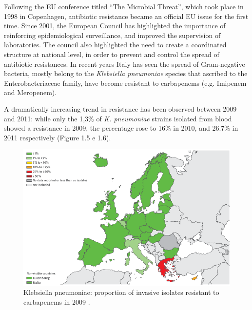 \documentclass[11pt]{report}
\begin{document}
\clearpage
Following the EU conference titled “The Microbial Threat”, which took place in 1998 in Copenhagen, antibiotic resistance became an official EU issue for the first time.
Since 2001, the European Council has highlighted the importance of reinforcing epidemiological surveillance, and improved the supervision of laboratories. The council also highlighted the need to create a coordinated structure at national level, in order to prevent and control the spread of antibiotic resistances.
In recent years Italy has seen the spread of Gram-negative bacteria, mostly belong to the \emph{Klebsiella pneumoniae} species that ascribed to the Enterobacteriaceae family, have become resistant to carbapenems (e.g. Imipenem and Meropenem).

A dramatically increasing trend in resistance has been observed between 2009 and 2011: while only the 1,3$\%$ of \emph{K. pneumoniae} strains isolated from blood showed a resistance in 2009, the percentage rose to 16$\%$ in 2010, and 26.7$\%$ in 2011 respectively (Figure 1.5 e 1.6).

\begin{figure}[htp]
\centering
\includegraphics[scale=0.60]{img/K.pneu_2009.png}
\caption{Klebsiella pneumoniae: proportion of invasive isolates resistant to carbapenems in 2009 \cite{ECDC_Surveillance}.}
\label{}
\end{figure}
\end{document}
